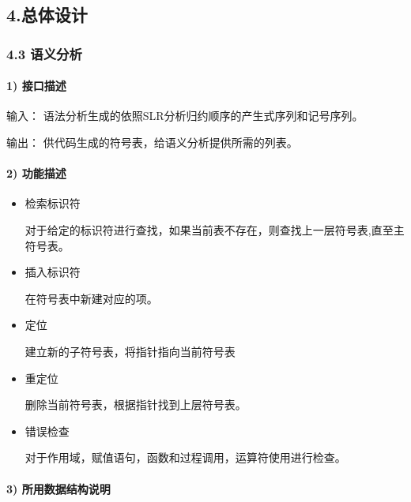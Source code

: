 \documentclass[]{ctexart}
\let\oldparagraph\paragraph
\renewcommand{\paragraph}[1]{\oldparagraph{#1}\mbox{}}
\begin{document}
\hypertarget{header-n117}{%
\subsection{4.总体设计}\label{header-n117}}

\hypertarget{header-n118}{%
\subsubsection{4.3 语义分析}\label{header-n118}}

\hypertarget{header-n119}{%
\paragraph{1) 接口描述}\label{header-n119}}

输入： 语法分析生成的依照SLR分析归约顺序的产生式序列和记号序列。

输出： 供代码生成的符号表，给语义分析提供所需的列表。

\hypertarget{header-n122}{%
\paragraph{2) 功能描述}\label{header-n122}}

\begin{itemize}
\item
  检索标识符

  对于给定的标识符进行查找，如果当前表不存在，则查找上一层符号表,直至主符号表。
\item
  插入标识符

  在符号表中新建对应的项。
\item
  定位

  建立新的子符号表，将指针指向当前符号表
\item
  重定位

  删除当前符号表，根据指针找到上层符号表。
\item
  错误检查

  对于作用域，赋值语句，函数和过程调用，运算符使用进行检查。
\end{itemize}

\hypertarget{header-n139}{%
\paragraph{3) 所用数据结构说明}\label{header-n139}}
\end{document}
